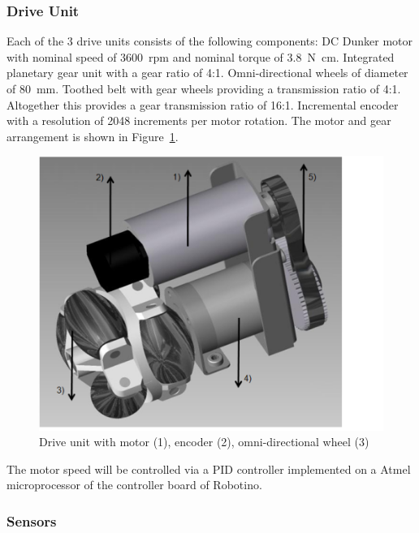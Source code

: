 \documentclass[12pt,twoside]{article}
\begin{document}
\begin{appendix}
\subsubsection{Drive Unit}
Each of the 3 drive units consists of the following components: DC
Dunker motor with nominal speed of \SI{3600}{rpm} and nominal torque
of \SI{3.8}{\newton\centi\metre}. Integrated planetary gear unit with
a gear ratio of 4:1. Omni-directional wheels of diameter of
\SI{80}{\milli\metre}. Toothed belt with gear wheels providing a
transmission ratio of 4:1.
%
Altogether this provides a gear transmission ratio of
16:1. Incremental encoder with a resolution of 2048 increments per
motor rotation.
%
The motor and gear arrangement is shown in
Figure~\ref{apx:fig:driveunit}.

\begin{figure}[tbh]
\centering
\includegraphics{driveunit.png}
\caption{Drive unit with motor (1), encoder (2), omni-directional wheel
(3)}
\label{apx:fig:driveunit}
\end{figure}

The motor speed will be controlled via a PID controller implemented on
a Atmel microprocessor of the controller board of Robotino.

\subsubsection{Sensors}


\end{appendix}
\end{document}
